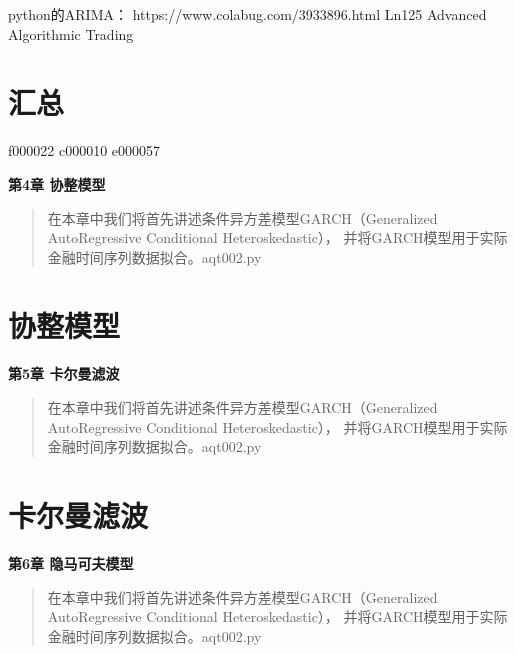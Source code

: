 \documentclass{article}
\begin{document}
python的ARIMA：   https://www.colabug.com/3933896.html
Ln125 Advanced Algorithmic Trading


\section{汇总}
f000022
c000010
e000057





















\maketitle\begin{center}
\Large \textbf{第4章 协整模型}
\end{center}
\begin{abstract}
在本章中我们将首先讲述条件异方差模型GARCH（Generalized AutoRegressive Conditional Heteroskedastic），
并将GARCH模型用于实际金融时间序列数据拟合。aqt002.py
\end{abstract}
\section{协整模型}

\maketitle\begin{center}
\Large \textbf{第5章 卡尔曼滤波}
\end{center}
\begin{abstract}
在本章中我们将首先讲述条件异方差模型GARCH（Generalized AutoRegressive Conditional Heteroskedastic），
并将GARCH模型用于实际金融时间序列数据拟合。aqt002.py
\end{abstract}
\section{卡尔曼滤波}

\maketitle\begin{center}
\Large \textbf{第6章 隐马可夫模型}
\end{center}
\begin{abstract}
在本章中我们将首先讲述条件异方差模型GARCH（Generalized AutoRegressive Conditional Heteroskedastic），
并将GARCH模型用于实际金融时间序列数据拟合。aqt002.py
\end{abstract}
\end{document}

